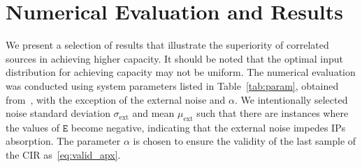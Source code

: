 \documentclass[journal]{IEEEtranTCOM}
\begin{document}
\section{Numerical Evaluation and Results}\label{sec:simulation_results}
We present a selection of results that illustrate the superiority of correlated sources in achieving higher capacity. It should be noted that the optimal input distribution for achieving capacity may not be uniform. The numerical evaluation was conducted using system parameters listed in Table~\ref{tab:param}, obtained from~\cite{vakilipoor2022asymptotic}, with the exception of the external noise and $\alpha$. We intentionally selected noise standard deviation $\sigma_{\text{ext}}$ and mean $\mu_{\text{ext}}$ such that there are instances where the values of $\mathtt{E}$ become negative, indicating that the external noise impedes IPs absorption. The parameter $\alpha$ is chosen to ensure the validity of the last sample of the CIR as~\eqref{eq:valid_apx}.
\begin{table}[!t]
\begin{center}
\caption{System parameters}
\label{tab:param}
\end{center}
\end{table}
\end{document}
